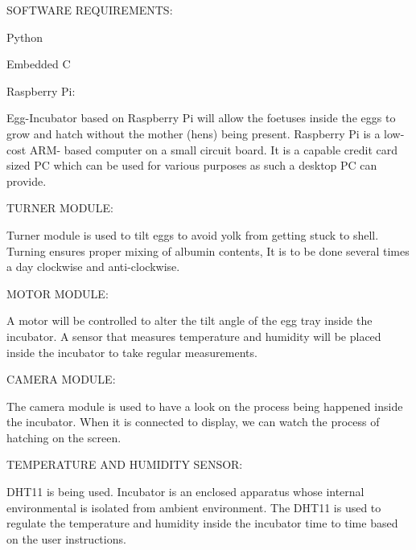 \documentclass[12pt]{article}
\begin{document}
\begin{flushleft}
SOFTWARE REQUIREMENTS:

Python

Embedded C

\end{flushleft}


\begin{flushleft}

Raspberry Pi:

Egg-Incubator based on Raspberry Pi will allow the foetuses inside the eggs to grow and hatch without the mother (hens) being present. Raspberry Pi is a low-cost ARM- based computer on a small circuit board. It is a capable credit card sized PC which can be used for various purposes as such a desktop PC can provide.

\end{flushleft}


\begin{flushleft}

TURNER MODULE:

Turner module is used to tilt eggs to avoid yolk from getting stuck to shell. Turning ensures proper mixing of albumin contents, It is to be done several times a day clockwise and anti-clockwise.

\end{flushleft}


\begin{flushleft}

MOTOR MODULE:

A motor will be controlled to alter the tilt angle of the egg tray inside the incubator. A sensor that measures temperature and humidity will be placed inside the incubator to take regular measurements.


\end{flushleft}

\begin{flushleft}

CAMERA MODULE:

The camera module is used to have a look on the process being happened inside the incubator. When it is connected to display, we can watch the process of hatching on the screen.


\end{flushleft}


\begin{flushleft}

TEMPERATURE AND HUMIDITY SENSOR:

DHT11 is being used. Incubator is an enclosed apparatus whose internal environmental is isolated from ambient environment. The DHT11 is used to regulate the temperature and humidity inside the incubator time to time based on the user instructions.


\end{flushleft}
\end{document}
